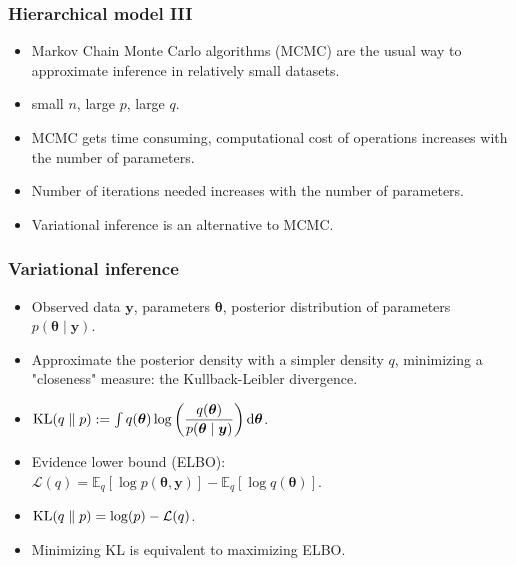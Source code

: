\documentclass{beamer}
\DeclareMathOperator*{\KL}{{\rm KL}}
\begin{document}
\begin{frame}
\frametitle{Hierarchical model III}
\begin{itemize}
\item Markov Chain Monte Carlo algorithms (MCMC) are the usual way to approximate inference in relatively small datasets.
\item small $n$, large $p$, large $q$.
\item MCMC gets time consuming, computational cost of operations increases with the number of parameters.
\item Number of iterations needed increases with the number of parameters.
\item Variational inference is an alternative to MCMC. 
\end{itemize}
\end{frame}

\begin{frame}
\frametitle{Variational inference}
\begin{itemize}
\item Observed data $\boldsymbol{y}$, parameters $\boldsymbol{\theta}$, posterior distribution of parameters $p(\boldsymbol{\theta} \mid \boldsymbol{y})$.
\item Approximate the posterior density with a simpler density $q$, minimizing a "closeness" measure: the Kullback-Leibler divergence.
\item $\KL(q\parallel p) := \int q(\boldsymbol{\theta})\log \left(\dfrac{q(\boldsymbol{\theta})}{p(\boldsymbol{\theta} \mid \boldsymbol{y})}\right) \mathrm{d}\boldsymbol{\theta}$.
\item Evidence lower bound (ELBO): $\mathcal{L}(q) = \mathbb{E}_q\left[\log p(\boldsymbol{\theta},\boldsymbol{y})\right] - \mathbb{E}_q\left[\log q(\boldsymbol{\theta})\right]$.
\item $\KL(q\parallel p) = \log(p) - \mathcal{L}(q)$.
\item Minimizing KL is equivalent to maximizing ELBO.
\end{itemize}
\end{frame}
\end{document}
